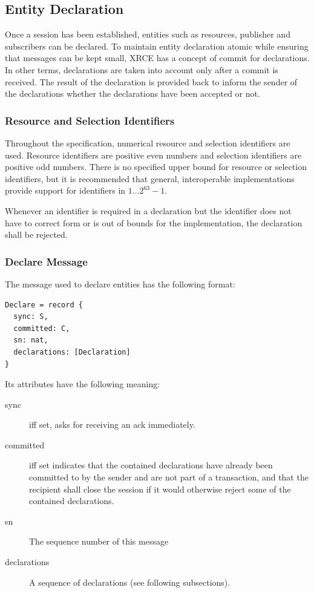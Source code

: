 \documentclass[a4paper,oneside,article]{memoir}
\begin{document}
\subsection{Entity Declaration}

Once a session has been established, entities such as resources, publisher and subscribers can be
declared.  To maintain entity declaration atomic while ensuring that messages can be kept small,
XRCE has a concept of commit for declarations.  In other terms, declarations are taken into account
only after a commit is received.  The result of the declaration is provided back to inform the
sender of the declarations whether the declarations have been accepted or not.

\subsubsection{Resource and Selection Identifiers}

Throughout the specification, numerical resource and selection identifiers are used.  Resource
identifiers are positive even numbers and selection identifiers are positive odd numbers.  There is
no specified upper bound for resource or selection identifiers, but it is recommended that general,
interoperable implementations provide support for identifiers in $1 \ldots{} 2^{63}-1$.

Whenever an identifier is required in a declaration but the identifier does not have to correct form
or is out of bounds for the implementation, the declaration shall be rejected.

\subsubsection{Declare Message}

The message used to declare entities has the following format:
\begin{verbatim}
Declare = record {
  sync: S,
  committed: C,
  sn: nat,
  declarations: [Declaration]
}  
\end{verbatim}

Its attributes have the following meaning:
\begin{description}
\item[sync] iff set, asks for receiving an ack immediately. 
\item[committed] iff set indicates that the contained declarations have already been committed to by
  the sender and are not part of a transaction, and that the recipient shall close the session if it
  would otherwise reject some of the contained declarations.
\item[sn] The sequence number of this message
\item[declarations] A sequence of declarations (see following subsections).
\end{description}
\end{document}
